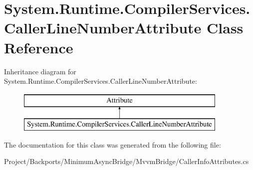 \hypertarget{class_system_1_1_runtime_1_1_compiler_services_1_1_caller_line_number_attribute}{}\section{System.\+Runtime.\+Compiler\+Services.\+Caller\+Line\+Number\+Attribute Class Reference}
\label{class_system_1_1_runtime_1_1_compiler_services_1_1_caller_line_number_attribute}
Inheritance diagram for System.\+Runtime.\+Compiler\+Services.\+Caller\+Line\+Number\+Attribute\+:\begin{figure}[H]
\begin{center}
\leavevmode
\includegraphics[height=2.000000cm]{class_system_1_1_runtime_1_1_compiler_services_1_1_caller_line_number_attribute}
\end{center}
\end{figure}


The documentation for this class was generated from the following file\+:\begin{DoxyCompactItemize}
\item 
Project/\+Backports/\+Minimum\+Async\+Bridge/\+Mvvm\+Bridge/Caller\+Info\+Attributes.\+cs\end{DoxyCompactItemize}
